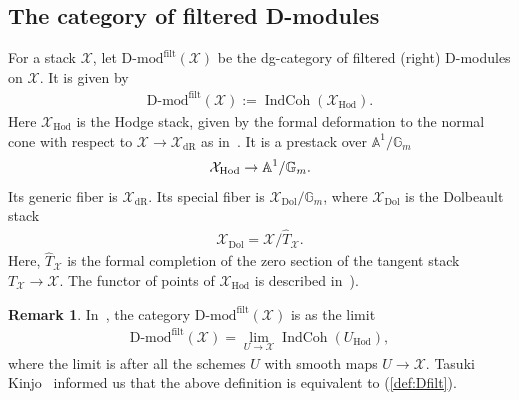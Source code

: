 \documentclass [11pt,oneside,a4paper,mathscr]{amsart}
\theoremstyle{definition}
\newtheorem{remark}[thm]{Remark}
\newcommand{\X}{\mathcal{X}}
\newcommand{\IndCoh}{\operatorname{IndCoh}}
\begin{document}
\subsection{The category of filtered D-modules}\label{subsec:filt}
For a stack $\mathcal{X}$, let
$\text{D-mod}^{\mathrm{filt}}(\mathcal{X})$ be 
the dg-category of filtered (right) D-modules on 
$\mathcal{X}$. It is given by 
\begin{align}\label{def:Dfilt}
    \text{D-mod}^{\mathrm{filt}}(\X):=\IndCoh(\mathcal{X}_{\mathrm{Hod}}).
\end{align}
Here $\mathcal{X}_{\mathrm{Hod}}$ is the Hodge stack, 
given by the formal deformation to the normal cone
with respect to $\mathcal{X}\to \mathcal{X}_{\mathrm{dR}}$ as in~\cite[Section~9.2.4]{MR3701353}. 
It is a 
prestack over $\mathbb{A}^1/\mathbb{G}_m$
\begin{align}\notag
    \mathcal{X}_{\mathrm{Hod}} \to \mathbb{A}^1/\mathbb{G}_m.
\end{align}
Its generic fiber is $\mathcal{X}_{\mathrm{dR}}$. Its special fiber is
$\mathcal{X}_{\mathrm{Dol}}/\mathbb{G}_m$, where $\mathcal{X}_{\mathrm{Dol}}$
is the Dolbeault stack 
\begin{align*}
    \mathcal{X}_{\mathrm{Dol}}=\mathcal{X}/\widehat{T}_{\mathcal{X}}.
\end{align*}
Here, $\widehat{T}_{\mathcal{X}}$ is the formal completion 
of the zero section of the tangent stack $T_{\mathcal{X}} \to \mathcal{X}$. 
The functor of points of $\X_{\mathrm{Hod}}$ is described 
in~\cite[Definition~2.3.5]{Bhattnote}).

\begin{remark}\label{rmk:hodge}
In~\cite{HChen}, the category $\text{D-mod}^{\mathrm{filt}}(\X)$ is as 
the limit 
\begin{align*}
    \text{D-mod}^{\mathrm{filt}}(\X)=\lim_{U\to \X}\IndCoh(U_{\mathrm{Hod}}),
\end{align*}
where the limit is after all the schemes $U$ with smooth maps $U\to \X$. Tasuki Kinjo~\cite{Kinjonote} informed us that the above definition is equivalent to (\ref{def:Dfilt}). 
\end{remark}
\end{document}
